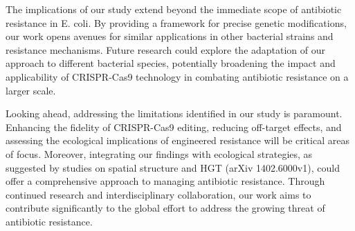 \documentclass{article}
\begin{document}
The implications of our study extend beyond the immediate scope of antibiotic resistance in E. coli. By providing a framework for precise genetic modifications, our work opens avenues for similar applications in other bacterial strains and resistance mechanisms. Future research could explore the adaptation of our approach to different bacterial species, potentially broadening the impact and applicability of CRISPR-Cas9 technology in combating antibiotic resistance on a larger scale.

Looking ahead, addressing the limitations identified in our study is paramount. Enhancing the fidelity of CRISPR-Cas9 editing, reducing off-target effects, and assessing the ecological implications of engineered resistance will be critical areas of focus. Moreover, integrating our findings with ecological strategies, as suggested by studies on spatial structure and HGT (arXiv 1402.6000v1), could offer a comprehensive approach to managing antibiotic resistance. Through continued research and interdisciplinary collaboration, our work aims to contribute significantly to the global effort to address the growing threat of antibiotic resistance.
\end{document}
